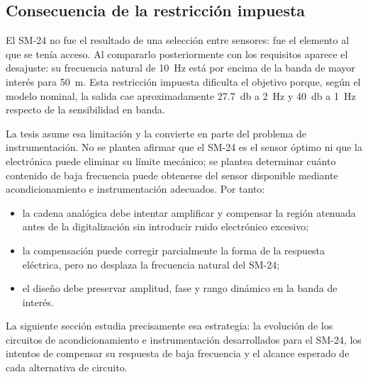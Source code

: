 \subsection{Consecuencia de la restricción impuesta}

El SM-24 no fue el resultado de una selección entre sensores: fue el elemento al que se
tenía acceso. Al compararlo posteriormente con los requisitos aparece el desajuste: su
frecuencia natural de \SI{10}{\hertz} está por encima de la banda de mayor interés para
\SI{50}{\meter}. Esta restricción impuesta dificulta el objetivo porque, según el modelo
nominal, la salida cae aproximadamente \SI{27.7}{\decibel} a \SI{2}{\hertz} y
\SI{40}{\decibel} a \SI{1}{\hertz} respecto de la sensibilidad en banda.

La tesis asume esa limitación y la convierte en parte del problema de instrumentación. No
se plantea afirmar que el SM-24 es el sensor óptimo ni que la electrónica puede eliminar
su límite mecánico; se plantea determinar cuánto contenido de baja frecuencia puede
obtenerse del sensor disponible mediante acondicionamiento e instrumentación adecuados.
Por tanto:

\begin{itemize}
    \item la cadena analógica debe intentar amplificar y compensar la región atenuada
    antes de la digitalización sin introducir ruido electrónico excesivo;
    \item la compensación puede corregir parcialmente la forma de la respuesta eléctrica,
    pero no desplaza la frecuencia natural del SM-24;
    \item el diseño debe preservar amplitud, fase y rango dinámico en la banda de interés.
\end{itemize}

La siguiente sección estudia precisamente esa estrategia: la evolución de los circuitos
de acondicionamiento e instrumentación desarrollados para el SM-24, los intentos de
compensar su respuesta de baja frecuencia y el alcance esperado de cada alternativa de
circuito.
